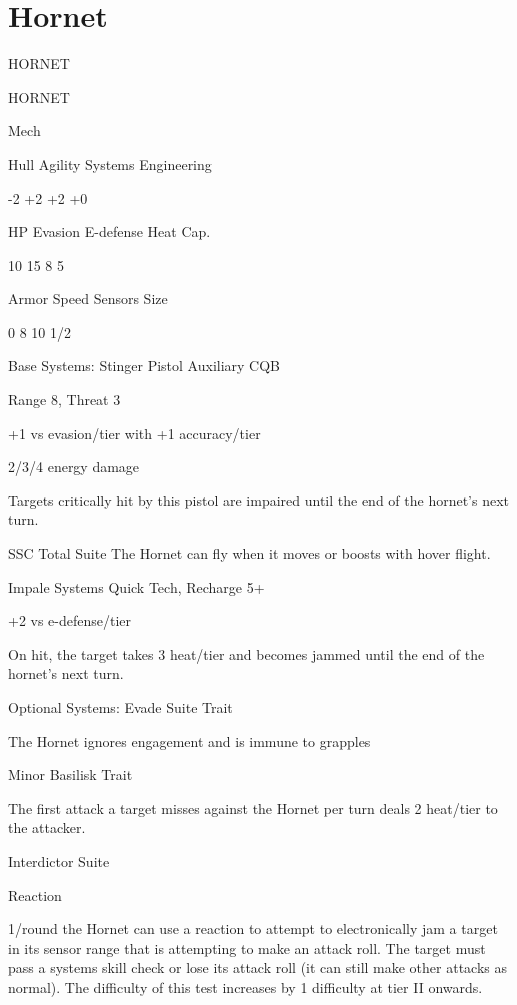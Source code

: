 \section{Hornet}

                                                HORNET

 HORNET

 Mech

 Hull       Agility      Systems       Engineering

 -2         +2           +2            +0

 HP         Evasion      E-defense     Heat Cap.

 10         15           8             5

 Armor      Speed        Sensors       Size

 0          8            10            1/2

Base Systems:
Stinger Pistol
Auxiliary CQB

Range 8, Threat 3

+1 vs evasion/tier with +1 accuracy/tier

2/3/4 energy damage

Targets critically hit by this pistol are impaired until the end of the hornet’s next turn.


SSC Total Suite
The Hornet can fly when it moves or boosts with hover flight.


Impale Systems
Quick Tech, Recharge 5+

+2 vs e-defense/tier

On hit, the target takes 3 heat/tier and becomes jammed until the end of the hornet’s next turn.


Optional Systems:
Evade Suite
Trait

The Hornet ignores engagement and is immune to grapples


Minor Basilisk
Trait

The first attack a target misses against the Hornet per turn deals 2 heat/tier to the attacker.


Interdictor Suite

Reaction





1/round the Hornet can use a reaction to attempt to electronically jam a target in its sensor range
that is attempting to make an attack roll. The target must pass a systems skill check or lose its
attack roll (it can still make other attacks as normal). The difficulty of this test increases by 1
difficulty at tier II onwards.


